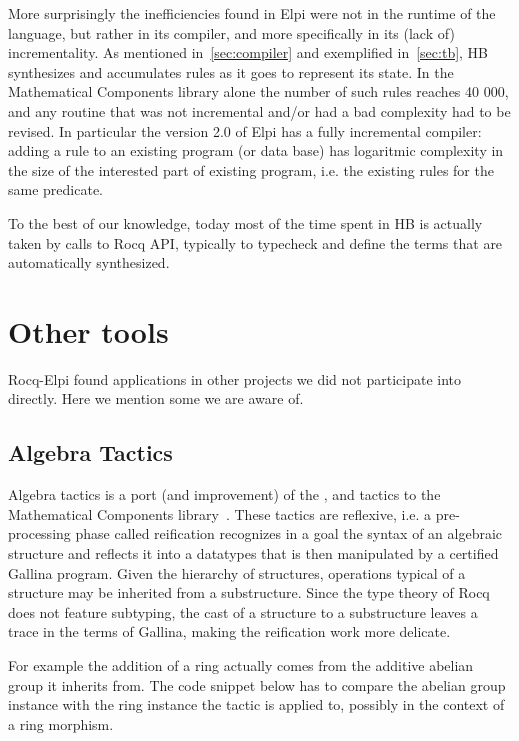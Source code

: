 \documentclass[a4paper, 11pt]{book}
\begin{document}
More surprisingly the inefficiencies found in Elpi were not in the runtime
of the language, but rather in its compiler, and more specifically in
its (lack of) incrementality. As mentioned in~\cref{sec:compiler} and exemplified
in~\cref{sec:tb}, HB synthesizes
and accumulates rules as it goes to represent its state. In the Mathematical
Components library alone
the number of such rules reaches 40 000, and any routine that was not incremental
and/or had a bad complexity had to be revised. In particular the version 2.0 of
Elpi has a fully incremental compiler: adding a rule to an existing program (or
data base) has logaritmic complexity in the size of the interested
part of existing program, i.e. the existing rules for the same predicate.

To the best of our knowledge, today most of the time spent in HB is actually taken
by calls to Rocq API, typically to typecheck and define the terms that are
automatically synthesized.

\section{Other tools}

Rocq-Elpi found applications in other projects we did not participate
into directly. Here we mention some we are aware of.

\subsection{Algebra Tactics}

Algebra tactics is a port (and improvement) of the ,  and
 tactics to the Mathematical Components library~\cite{sakaguchi:LIPIcs.ITP.2022.29}.
These tactics are reflexive, i.e. a pre-processing phase called reification
recognizes in a goal the syntax of an algebraic structure and reflects it into
a datatypes that is then manipulated by a certified Gallina program.
Given the hierarchy of structures, operations typical of a structure may be
inherited from a substructure. Since the type theory of Rocq does not feature
subtyping, the cast of a structure to a substructure leaves a trace in
the terms of Gallina, making the reification work more delicate.

For example the addition of a ring actually comes from the
additive abelian group it inherits from. The code snippet below
has to compare the abelian group instance  with the ring
instance  the tactic is applied to, possibly in the context
 of a ring morphism.
\end{document}
